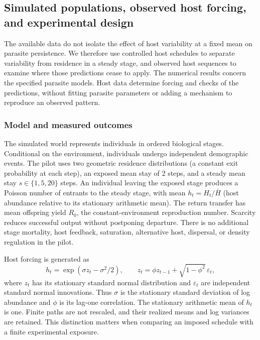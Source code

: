 \subsection{Simulated populations, observed host forcing, and experimental design}
\label{num-esm-simworld}

The available data do not isolate the effect of host variability at a fixed
mean on parasite persistence. We therefore use controlled host schedules to
separate variability from residence in a steady stage, and observed host
sequences to examine where those predictions cease to apply. The numerical
results concern the specified parasite models. Host data determine forcing
and checks of the predictions, without fitting parasite parameters or adding
a mechanism to reproduce an observed pattern.

\subsubsection{Model and measured outcomes}
\label{num-esm-model}

The simulated world represents individuals in ordered biological stages.
Conditional on the environment, individuals undergo independent demographic
events. The pilot uses two geometric residence distributions (a constant
exit probability at each step), an exposed mean stay of 2 steps, and a steady
mean stay $s\in\{1,5,20\}$ steps. An individual leaving the exposed stage
produces a Poisson number of entrants to the steady stage, with mean
$h_t=H_t/\bar H$ (host abundance relative to its stationary arithmetic mean).
The return transfer has mean offspring yield $R_0$, the constant-environment
reproduction number. Scarcity reduces successful output without postponing
departure. There is no additional stage mortality, host feedback, saturation,
alternative host, dispersal, or density regulation in the pilot.

Host forcing is generated as
\begin{equation}
 h_t=\exp(\sigma z_t-\sigma^2/2),\qquad
 z_t=\phi z_{t-1}+\sqrt{1-\phi^2}\,\varepsilon_t,
 \label{num-host-forcing}
\end{equation}
where $z_t$ has its stationary standard normal distribution and
$\varepsilon_t$ are independent standard normal innovations. Thus $\sigma$
is the stationary standard deviation of log abundance and $\phi$ is its
lag-one correlation. The stationary arithmetic mean of $h_t$ is one.
Finite paths are not rescaled, and their realized means and log variances
are retained. This distinction matters when comparing an imposed schedule
with a finite experimental exposure.

